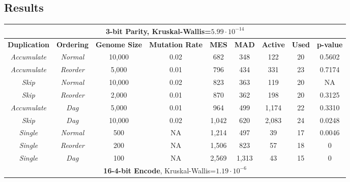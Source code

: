 \documentclass[journal]{IEEEtran}
\begin{document}
\subsection{Results}

\begin{table*}
	\centering
	\begin{tabular}{|c|c|c|c|c|c|c|c|c|}
	  \hline
	  \multicolumn{9}{|c|}{\textbf{3-bit Parity}, Kruskal-Wallis=$5.99\cdot 10^{-14}$} \\ \hline
\textbf{Duplication} & \textbf{Ordering} & \textbf{Genome Size} & \textbf{Mutation Rate} & \textbf{MES} & \textbf{MAD} & \textbf{Active} & \textbf{Used} & \textbf{p-value} \\ \hline
\emph{Accumulate} & \emph{Normal} & 10,000 & 0.02 & 682 & 348 & 122 & 20 & 0.5602 \\ \hline
\emph{Accumulate} & \emph{Reorder}&  5,000 & 0.01 & 796 & 434 & 331 & 23 & 0.7174 \\ \hline
\rowcolor{Gray}
\emph{Skip} & \emph{Normal}       & 10,000 & 0.02 & 823 & 363 & 119 & 20 & NA \\ \hline
\emph{Skip} & \emph{Reorder}      &  2,000 & 0.01 & 870 & 362 & 198 & 20 & 0.3125 \\ \hline
\emph{Accumulate} & \emph{Dag}    &  5,000 & 0.01 & 964 & 499 & 1,174 & 22 & 0.3310 \\ \hline
\emph{Skip} & \emph{Dag}          & 10,000 & 0.02 & 1,042 & 620 & 2,083 & 24 & 0.0248 \\ \hline
\emph{Single} & \emph{Normal}     & 500 & NA & 1,214 & 497 & 39 & 17 & 0.0046 \\ \hline
\emph{Single} & \emph{Reorder}    & 200 & NA & 1,506 & 823 & 57 & 18 & 0 \\ \hline
\emph{Single} & \emph{Dag}        & 100 & NA & 2,569 & 1,313 & 43 & 15 & 0 \\ \hline\hline

	  \multicolumn{9}{|c|}{\textbf{16-4-bit Encode}, Kruskal-Wallis=$1.19\cdot 10^{-6}$} \\ \hline


\end{tabular}
\end{table*}
\end{document}
